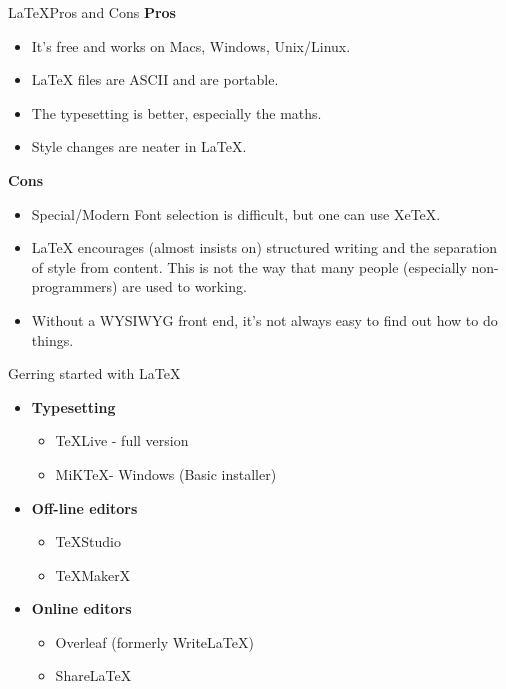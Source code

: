 \documentclass[10pt,times]{beamer}
\begin{document}

\begin{frame}{\LaTeX Pros and Cons}
\textbf{Pros}
\begin{itemize}
\item    It's free and works on Macs, Windows, Unix/Linux.
\item    LaTeX files are ASCII and are portable.
\item    The typesetting is better, especially the maths.
\item    Style changes are neater in LaTeX.
\end{itemize}
\textbf{Cons}
\begin{itemize}
\item    Special/Modern Font selection is difficult, but one can use XeTeX.
\item    LaTeX encourages (almost insists on) structured writing and the 
separation of style from content. This is not the way that many people 
(especially non-programmers) are used to working.
\item    Without a WYSIWYG front end, it's not always easy to find out how to 
do things.
\end{itemize}
\end{frame}

\begin{frame}{Gerring started with \LaTeX}
\begin{itemize}
\item \textbf{Typesetting}
\begin{itemize}
\item \TeX Live - full version
\item MiK\TeX - Windows (Basic installer)
\end{itemize}
\item \textbf{Off-line editors}
\begin{itemize}
\item \TeX Studio
\item \TeX MakerX
\end{itemize}
\item \textbf{Online editors}
\begin{itemize}
\item Overleaf (formerly Write\LaTeX)
\item Share\LaTeX
\end{itemize}

\end{itemize}

\end{frame}
\end{document}
